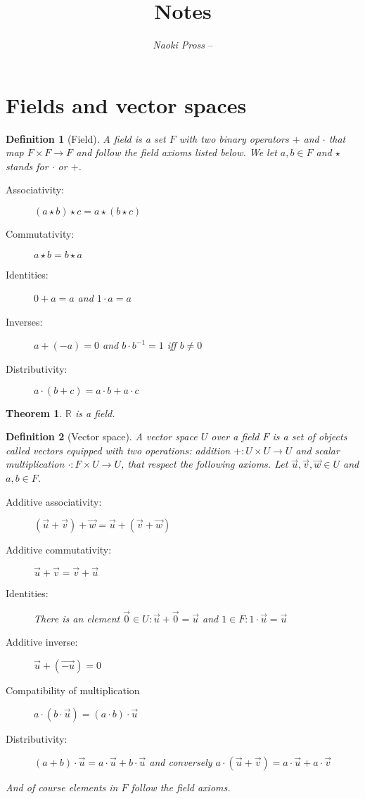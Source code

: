 \documentclass[twocolumn, margin=normal]{tex/hsrzf}
\author{\textsl{Naoki Pross} -- \texttt{\theauthoremail}}
\title{\texttt{\themodule} Notes}
\date{\thesemester}
\newcommand\Rset{\mathbb{R}}
\theoremstyle{fuvarzf}
\newtheorem{theorem}{Theorem}
\newtheorem{definition}{Definition}
\begin{document}
\maketitle
\tableofcontents

\section{Fields and vector spaces}

\begin{definition}[Field]
  A field is a set \(F\) with two binary operators \(+\) and \(\cdot\) that map
  \(F\times F \to F\) and follow the \emph{field axioms} listed below. We let 
  \(a, b \in F\) and \(\star\) stands for \(\cdot\) or \(+\).
  \begin{description}
    \item[Associativity:] \((a \star b) \star c = a \star (b \star c)\)
    \item[Commutativity:] \(a \star b = b \star a\) 
    \item[Identities:] \(0 + a = a\) and \(1\cdot a = a\)
    \item[Inverses:]
        \(a + (-a) = 0\) and 
        \(b \cdot b^{-1} = 1\) iff \(b \neq 0\)
    \item[Distributivity:] \(a \cdot (b + c) = a\cdot b + a \cdot c\)
  \end{description}
\end{definition}

\begin{theorem}
  \(\Rset\) is a field.
\end{theorem}

\begin{definition}[Vector space]
  A vector space \(U\) over a field \(F\) is a set of objects called
  \emph{vectors} equipped with two operations: \emph{addition} 
  \(+: U \times U \to U\) and \emph{scalar multiplication} 
  \(\cdot: F\times U \to U\), that respect the following axioms.
  Let \(\vec{u}, \vec{v}, \vec{w} \in U\) and \(a, b \in F\).
  \begin{description}
    \item[Additive associativity:] \((\vec{u} + \vec{v}) + \vec{w} 
      = \vec{u} + (\vec{v} + \vec{w})\)
    \item[Additive commutativity:] \(\vec{u} + \vec{v} = \vec{v} + \vec{u}\)
    \item[Identities:] There is an element 
      \(\vec{0} \in U : \vec{u} + \vec{0} = \vec{u}\) 
      and \(1 \in F : 1 \cdot \vec{u} = \vec{u}\)
    \item[Additive inverse:] \(\vec{u} + (\vec{-u}) = 0\)
    \item[Compatibility of multiplication] 
      \(a\cdot (b \cdot \vec{u}) = (a\cdot b) \cdot \vec{u}\)
    \item[Distributivity:]
      \((a + b) \cdot \vec{u} = a\cdot\vec{u} + b\cdot\vec{u}\) and conversely
      \(a \cdot (\vec{u} + \vec{v}) = a\cdot\vec{u} + a\cdot\vec{v}\)
  \end{description}
  And of course elements in \(F\) follow the field axioms.
\end{definition}
\end{document}
